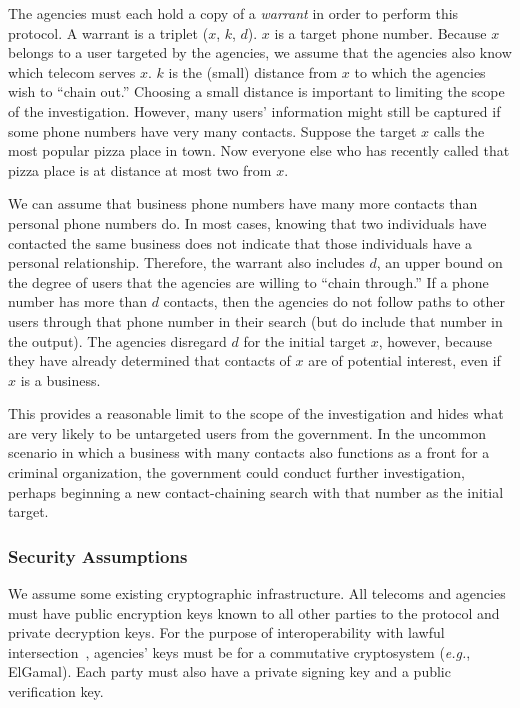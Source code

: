 The agencies must each hold a copy of a \emph{warrant} in order to perform this protocol. A warrant is a triplet ($x$, $k$, $d$). $x$ is a target phone number. Because $x$ belongs to a user targeted by the agencies, we assume that the agencies also know which telecom serves $x$. $k$ is the (small) distance from $x$ to which the agencies wish to ``chain out.'' 
Choosing a small distance is important to limiting the scope of the investigation. However, many users' information might still be captured if some phone numbers have very many contacts. Suppose the target $x$ calls the most popular pizza place in town. Now everyone else who has recently called that pizza place is at distance at most two from $x$.

We can assume that business phone numbers have many more contacts than personal phone numbers do. In most cases, knowing that two individuals have contacted the same business does not indicate that those individuals have a personal relationship. Therefore, the warrant also includes $d$, an upper bound on the degree of users that the agencies are willing to ``chain through.'' If a phone number has more than $d$ contacts, then the agencies do not follow paths to other users through that phone number in their search (but do include that number in the output). The agencies disregard $d$ for the initial target $x$, however, because they have already determined that contacts of $x$ are of potential interest, even if $x$ is a business. 

This provides a reasonable limit to the scope of the investigation and hides what are very likely to be untargeted users from the government. In the uncommon scenario in which a business with many contacts also functions as a front for a criminal organization, the government could conduct further investigation, perhaps beginning a new contact-chaining search with that number as the initial target.

\subsubsection{Security Assumptions}

We assume some existing cryptographic infrastructure. 
All telecoms and agencies must have public encryption keys known to all other parties to the protocol and private decryption keys. 
For the purpose of interoperability with lawful intersection~\cite{sff-foci2014}, agencies' keys must be for a commutative cryptosystem ({\it e.g.}, ElGamal). 
Each party must also have a private signing key and a public verification key.

